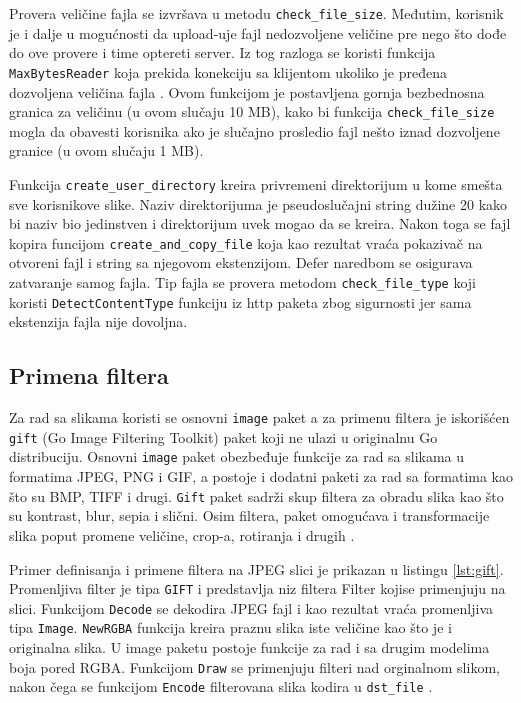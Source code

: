 \documentclass[12pt,oneside]{memoir}
\begin{document}
Provera veličine fajla se izvršava u metodu \texttt{check\_file\_size}. Međutim, korisnik je i dalje u mogućnosti da upload-uje fajl nedozvoljene veličine pre nego što dođe do ove provere i time optereti server. Iz tog razloga se koristi funkcija \texttt{MaxBytesReader} koja prekida konekciju sa klijentom ukoliko je pređena dozvoljena veličina fajla \cite{http}. Ovom funkcijom je postavljena gornja bezbednosna granica za veličinu (u ovom slučaju 10 MB), kako bi funkcija \texttt{check\_file\_size} mogla da obavesti korisnika ako je slučajno prosledio fajl nešto iznad dozvoljene granice (u ovom slučaju 1 MB). 

Funkcija \texttt{create\_user\_directory} kreira privremeni direktorijum u kome smešta sve korisnikove slike. Naziv direktorijuma je pseudoslučajni string dužine 20 kako bi naziv bio jedinstven i direktorijum uvek mogao da se kreira. Nakon toga se fajl kopira funcijom \texttt{create\_and\_copy\_file} koja kao rezultat vraća pokazivač na otvoreni fajl i string sa njegovom ekstenzijom. Defer naredbom se osigurava zatvaranje samog fajla. Tip fajla se provera metodom  \texttt{check\_file\_type} koji koristi \texttt{DetectContentType} funkciju iz http paketa zbog sigurnosti jer sama ekstenzija fajla nije dovoljna.
 
\subsection{Primena filtera}

Za rad sa slikama koristi se osnovni \texttt{image} paket a za primenu filtera je iskorišćen \texttt{gift} (Go Image Filtering Toolkit) paket\cite{gift} koji ne ulazi u originalnu Go distribuciju. Osnovni \texttt{image} paket obezbeđuje funkcije za rad sa slikama u formatima JPEG, PNG i GIF, a postoje i dodatni paketi za rad sa formatima kao što su BMP, TIFF i drugi\cite{image}. \texttt{Gift} paket sadrži skup filtera za obradu slika kao što su kontrast, blur, sepia i slični. Osim filtera, paket omogućava i transformacije slika poput promene veličine, crop-a, rotiranja i drugih \cite{gift}.

Primer definisanja i primene filtera na JPEG slici je prikazan u listingu \ref{lst:gift}. Promenljiva filter je tipa  \texttt{GIFT} i predstavlja niz filtera Filter kojise primenjuju na slici. Funkcijom  \texttt{Decode} se dekodira JPEG fajl i kao rezultat vraća promenljiva tipa  \texttt{Image}.  \texttt{NewRGBA} funkcija kreira praznu slika iste veličine kao što je i originalna slika. U image paketu postoje funkcije za rad i sa drugim modelima boja pored RGBA. Funkcijom  \texttt{Draw} se primenjuju filteri nad orginalnom slikom, nakon čega se funkcijom  \texttt{Encode} filterovana slika kodira u  \texttt{dst\_file} \cite{gift}.
\end{document}
